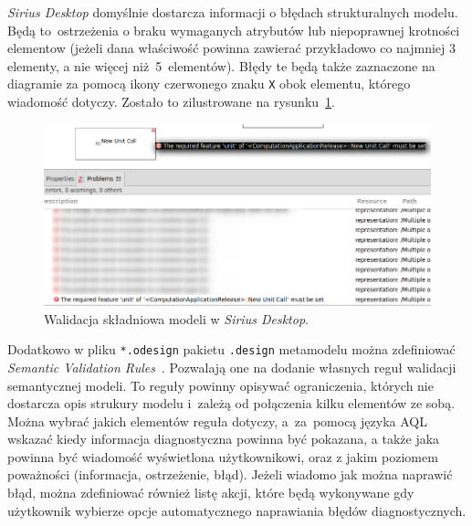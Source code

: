 \emph{Sirius Desktop} domyślnie dostarcza informacji o błędach strukturalnych
modelu. Będą to~ostrzeżenia o braku wymaganych atrybutów lub niepoprawnej
krotności elementow (jeżeli dana właściwość powinna zawierać przykładowo co
najmniej 3 elementy, a nie więcej niż~5~elementów). Błędy te będą także
zaznaczone na diagramie za pomocą ikony czerwonego znaku \texttt{X} obok
elementu, którego wiadomość dotyczy. Zostało to zilustrowane na
rysunku~\ref{rys:sirius-desktop-syntax-validation}.

\begin{figure}[!hb]
	\centering

	\includegraphics[width=0.95\linewidth]{./images/sirius-desktop-syntax-validation.png}
	\caption{Walidacja składniowa modeli w \emph{Sirius
  Desktop}.}\label{rys:sirius-desktop-syntax-validation}
\end{figure}

Dodatkowo w pliku \texttt{*.odesign} pakietu \texttt{.design} metamodelu można
zdefiniować \emph{Semantic Validation
	Rules}~\cite{sirius-desktop-documentation-validation-rules}.
Pozwalają one na dodanie własnych reguł walidacji semantycznej modeli. To
reguły powinny opisywać ograniczenia, których nie dostarcza opis strukury
modelu i~zależą od połączenia kilku elementów ze sobą. Można
wybrać jakich elementów reguła dotyczy, a~za~pomocą języka \gls{AQL} wskazać
kiedy informacja diagnostyczna powinna być pokazana, a także jaka powinna być
wiadomość wyświetlona użytkownikowi, oraz z jakim poziomem poważności
(informacja, ostrzeżenie, błąd). Jeżeli wiadomo jak można naprawić błąd, można
zdefiniować również listę akcji, które będą wykonywane gdy użytkownik wybierze
opcje automatycznego naprawiania błędów diagnostycznych.

